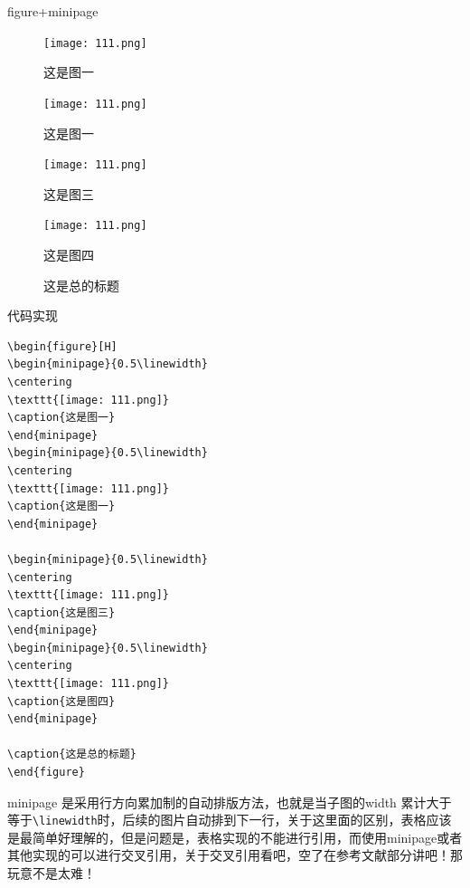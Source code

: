 \documentclass[cn,chinese,color=cyan]{elegantbook}
\begin{document}
\begin{center}
figure+minipage	
\end{center}
\begin{figure}[H]
	\begin{minipage}{0.5\linewidth}
		\centering
		\texttt{[image: 111.png]}
		\caption{这是图一}
	\end{minipage}	
	\begin{minipage}{0.5\linewidth}
		\centering
		\texttt{[image: 111.png]}
		\caption{这是图一}
	\end{minipage}	
	
	\begin{minipage}{0.5\linewidth}
		\centering
		\texttt{[image: 111.png]}
		\caption{这是图三}
	\end{minipage}
	\begin{minipage}{0.5\linewidth}
		\centering
		\texttt{[image: 111.png]}
		\caption{这是图四}
	\end{minipage}
	
	\caption{这是总的标题}
\end{figure}
代码实现
\begin{lstlisting}[style=R]
\begin{figure}[H]
\begin{minipage}{0.5\linewidth}
\centering
\texttt{[image: 111.png]}
\caption{这是图一}
\end{minipage}	
\begin{minipage}{0.5\linewidth}
\centering
\texttt{[image: 111.png]}
\caption{这是图一}
\end{minipage}	

\begin{minipage}{0.5\linewidth}
\centering
\texttt{[image: 111.png]}
\caption{这是图三}
\end{minipage}
\begin{minipage}{0.5\linewidth}
\centering
\texttt{[image: 111.png]}
\caption{这是图四}
\end{minipage}

\caption{这是总的标题}
\end{figure}
\end{lstlisting}
\begin{note}
minipage 是采用行方向累加制的自动排版方法，也就是当子图的width 累计大于
等于\verb|\linewidth|时，后续的图片自动排到下一行，关于这里面的区别，表格应该是最简单好理解的，但是问题是，表格实现的不能进行引用，而使用minipage或者其他实现的可以进行交叉引用，关于交叉引用看吧，空了在参考文献部分讲吧！那玩意不是太难！
\end{note}
\end{document}
